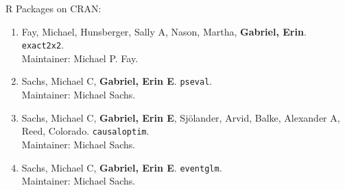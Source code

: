\documentclass[12pt]{article}
\begin{document}
R Packages on CRAN:
\begin{enumerate}
\item  Fay, Michael,  Hunsberger, Sally A, Nason, Martha, \textbf{Gabriel, Erin}. \texttt{exact2x2}.\\ Maintainer: Michael P. Fay.

\item  Sachs, Michael C, \textbf{Gabriel, Erin E}. \texttt{pseval}. \\Maintainer: Michael Sachs.

\item Sachs, Michael C, \textbf{Gabriel, Erin E}, Sjölander, Arvid, Balke, Alexander A, Reed, Colorado. \texttt{causaloptim}. \\Maintainer: Michael Sachs.

\item Sachs, Michael C, \textbf{Gabriel, Erin E}. \texttt{eventglm}. \\Maintainer: Michael Sachs.
\end{enumerate}
\end{document}

